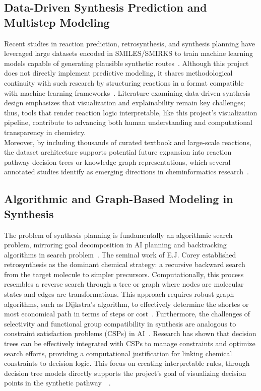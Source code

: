 \documentclass[12pt]{article}
\begin{document}
\subsection{Data-Driven Synthesis Prediction and Multistep Modeling}
\indent
Recent studies in reaction prediction, retrosynthesis, and synthesis planning have leveraged large datasets encoded in SMILES/SMIRKS to train machine learning models capable of generating plausible synthetic routes~\cite{dai2019retrosynthesis}.
Although this project does not directly implement predictive modeling, it shares methodological continuity with such research by structuring reactions in a format compatible with machine learning frameworks~\cite{hormazabal2022cede}.
Literature examining data-driven synthesis design emphasizes that visualization and explainability remain key challenges; thus, tools that render reaction logic interpretable, like this project’s visualization pipeline, contribute to advancing both human understanding and computational transparency in chemistry.
\\
\indent
Moreover, by including thousands of curated textbook and large-scale reactions, the dataset architecture supports potential future expansion into reaction pathway decision trees or knowledge graph representations, which several annotated studies identify as emerging directions in cheminformatics research~\cite{10.1016/j.tcs.2025.115344}.
\subsection{Algorithmic and Graph-Based Modeling in Synthesis}
\noindent
The problem of synthesis planning is fundamentally an algorithmic search problem, mirroring goal decomposition in AI planning and backtracking algorithms in search problem~\cite{dai2019retrosynthesis}.
The seminal work of E.J. Corey established retrosynthesis as the dominant chemical strategy: a recursive backward search from the target molecule to simpler precursors.
Computationally, this process resembles a reverse search through a tree or graph where nodes are molecular states and edges are transformations.
This approach requires robust graph algorithms, such as Dijkstra's algorithm, to effectively determine the shortes or most economical path in terms of steps or cost~\cite{clrsAlgorithms}.
Furthermore, the challenges of selectivity and functional group compatibility in synthesis are analogous to constraint satisfaction problems (CSPs) in AI~\cite{10.1109/ICTAI.2004.38}.
Research has shown that decision trees can be effectively integrated with CSPs to manage constraints and optimize search efforts, providing a computational justification for linking chemical constraints to decision logic.
This focus on creating interpretable rules, through decision tree models directly supports the project's goal of visualizing decision points in the synthetic pathway~\cite{10.24963/ijcai.2023/225}~\cite{10.1016/j.tcs.2025.115344}.
\end{document}
